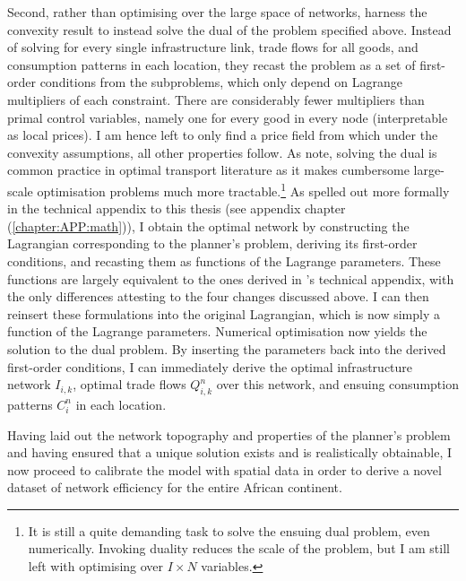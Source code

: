 \documentclass[11pt, oneside]{article}   	%
\let\oldref\ref
\renewcommand{\ref}[1]{(\oldref{#1})}
\begin{document}
Second, rather than optimising over the large space of networks, \citeauthor{fajgelbaum_optimal_2017} harness the convexity result to instead solve the dual of the problem specified above. Instead of solving for every single infrastructure link, trade flows for all goods, and consumption patterns in each location, they recast the problem as a set of first-order conditions from the subproblems, which only depend on Lagrange multipliers of each constraint. There are considerably fewer multipliers than primal control variables, namely one for every good in every node (interpretable as local prices). I am hence left to only find a price field from which under the convexity assumptions, all other properties follow. As \citeauthor{fajgelbaum_optimal_2017} note, solving the dual is common practice in optimal transport literature as it makes cumbersome large-scale optimisation problems much more tractable.\footnote{It is still a quite demanding  task to solve the ensuing dual problem, even numerically. Invoking duality reduces the scale of the problem, but I am still left with optimising over $I \times N$ variables.} As spelled out more formally in the technical appendix to this thesis (see appendix chapter \ref{chapter:APP:math}), I obtain the optimal network by constructing the Lagrangian corresponding to the planner's problem, deriving its first-order conditions, and recasting them as functions of the Lagrange parameters. These functions are largely equivalent to the ones derived in \citeauthor{fajgelbaum_optimal_2017}'s technical appendix, with the only differences attesting to the four changes discussed above. I can then reinsert these formulations into the original Lagrangian, which is now simply a function of the Lagrange parameters. Numerical optimisation now yields the solution to the dual problem. By inserting the parameters back into the derived first-order conditions, I can immediately derive the optimal infrastructure network $I_{i,k}$, optimal trade flows $Q_{i,k}^{n}$ over this network, and ensuing consumption patterns $C_{i}^{n}$ in each location.

Having laid out the network topography and properties of the planner's problem and having ensured that a unique solution exists and is realistically obtainable, I now proceed to calibrate the model with spatial data in order to derive a novel dataset of network efficiency for the entire African continent.
\end{document}
